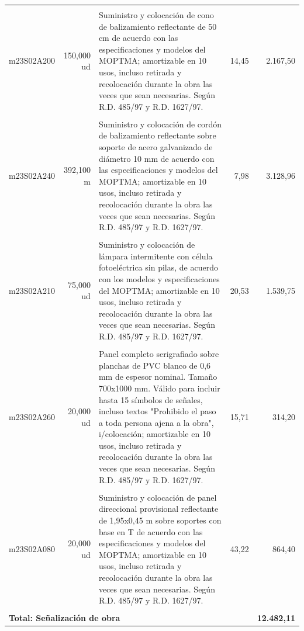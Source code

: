 \documentclass{book}%
\begin{document}
\begin{longtable}{lrlrr}
&&&&\\%
m23S02A200&   150,000 ud&\multicolumn{1}{p{5cm}}{Suministro y colocación de cono de balizamiento reflectante de 50 cm de acuerdo con las especificaciones y modelos del MOPTMA; amortizable en 10 usos, incluso retirada y recolocación durante la obra las veces que sean necesarias. Según R.D. 485/97 y R.D. 1627/97.}&     14,45&2.167,50\\%
&&&&\\%
m23S02A240&   392,100 m&\multicolumn{1}{p{5cm}}{Suministro y colocación de cordón de balizamiento reflectante sobre soporte de acero galvanizado de diámetro 10 mm de acuerdo con las especificaciones y modelos del MOPTMA; amortizable en 10 usos, incluso retirada y recolocación durante la obra las veces que sean necesarias. Según R.D. 485/97 y R.D. 1627/97.}&      7,98&3.128,96\\%
&&&&\\%
m23S02A210&    75,000 ud&\multicolumn{1}{p{5cm}}{Suministro y colocación de lámpara intermitente con célula fotoeléctrica sin pilas, de acuerdo con los modelos y especificaciones del MOPTMA; amortizable en 10 usos, incluso retirada y recolocación durante la obra las veces que sean necesarias. Según R.D. 485/97 y R.D. 1627/97.}&     20,53&1.539,75\\%
&&&&\\%
m23S02A260&    20,000 ud&\multicolumn{1}{p{5cm}}{Panel completo serigrafiado sobre planchas de PVC blanco de 0,6 mm de espesor nominal. Tamaño 700x1000 mm. Válido para incluir hasta 15 símbolos de señales, incluso textos "Prohibido el paso a toda persona ajena a la obra", i/colocación; amortizable en 10 usos, incluso retirada y recolocación durante la obra las veces que sean necesarias. Según R.D. 485/97 y R.D. 1627/97.}&     15,71&314,20\\%
&&&&\\%
m23S02A080&    20,000 ud&\multicolumn{1}{p{5cm}}{Suministro y colocación de panel direccional provisional reflectante de 1,95x0,45 m sobre soportes con base en T de acuerdo con las especificaciones y modelos del MOPTMA; amortizable en 10 usos, incluso retirada y recolocación durante la obra las veces que sean necesarias. Según R.D. 485/97 y R.D. 1627/97.}&     43,22&864,40\\%
&&&&\\%
\multicolumn{4}{p{8cm}}{\textbf{Total: Señalización de obra}}&\textbf{12.482,11}\\%
\end{longtable}%
\normalsize
\end{document}
